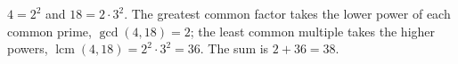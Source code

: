 $4=2^2$ and $18=2\cdot3^2$. The greatest common factor takes the lower power of each common prime, $\gcd(4,18)=2$; the least common multiple takes the higher powers, $\operatorname{lcm}(4,18)=2^2\cdot3^2=36$. The sum is $2+36=\boxed{38}$.
